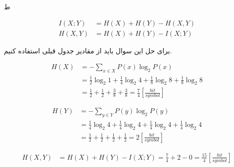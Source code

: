 \SubProblem
{ط}
{
    \begin{equation*}
    \begin{aligned}
        I(X;Y) &= H(X) + H(Y) - H(X,Y)\\
        H(X,Y) &= H(X) + H(Y) - I(X;Y)
    \end{aligned}
    \end{equation*}
    
    برای حل این سوال باید از مقادیر جدول قبلی استفاده کنیم.

    \begin{equation*}
    \begin{aligned}
        H(X) &= -\sum_{x \in X} P(x) \log_2 {P(x)}\\
        &= \frac{1}{2}\log_2 1 + \frac{1}{4}\log_2 4 + \frac{1}{8}\log_2 8 + \frac{1}{8}\log_2 8 \\
        &= \frac{1}{2} + \frac{1}{2} + \frac{3}{8} + \frac{3}{8} = \frac{7}{4} [\frac{bit}{symbol}]
    \end{aligned}
    \end{equation*}
    
    \begin{equation*}
    \begin{aligned}
        H(Y) &= -\sum_{y \in Y} P(y) \log_2 {P(y)}\\
        &= \frac{1}{4}\log_2 4 + \frac{1}{4}\log_2 4 + \frac{1}{4}\log_2 4 + \frac{1}{4}\log_2 4 \\
        &= \frac{1}{2} + \frac{1}{2} + \frac{1}{2} + \frac{1}{2} = 2 [\frac{bit}{symbol}]
    \end{aligned}
    \end{equation*}
    
    \begin{equation*}
    \begin{aligned}
        H(X,Y) &= H(X) + H(Y) - I(X;Y) = \frac{7}{4} + 2 - 0 = \frac{15}{4} [\frac{bit}{symbol}]
    \end{aligned}
    \end{equation*}
}